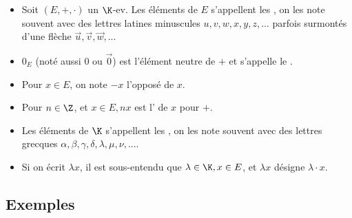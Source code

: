 \documentclass[12pt, a4paper]{report}
\begin{document}
\begin{remarque}[Vocabulaire]{}

\begin{itemize}

	\item Soit $(E,+,\cdot)$ un $\K$-ev. Les éléments de $E$ s'appellent les , on les note souvent avec des lettres latines minuscules $u,v,w,x,y,z,...$ parfois surmontés d'une flèche $\vec{u}, \vec{v}, \vec{w},...$
	
	\item $0_E$ (noté aussi $0$ ou $\vec{0}$) est l'élément neutre de $+$ et s'appelle le .
	
	\item Pour $x\in E$, on note $-x$ l'opposé de $x$.
	
	\item Pour $n \in \Z$, et $x \in E, nx$ est l' de $x$ pour $+$.
	
	\item Les éléments de $\K$ s'appellent les , on les note souvent avec des lettres grecques $\alpha, \beta, \gamma, \delta, \lambda, \mu, \nu,...$.
	
	\item Si on écrit $\lambda x$, il est sous-entendu que $\lambda \in \K, x \in E$, et $\lambda x $ désigne $\lambda \cdot x$.
	
\end{itemize}

\end{remarque}

\newpage

\subsection{Exemples}
\end{document}
